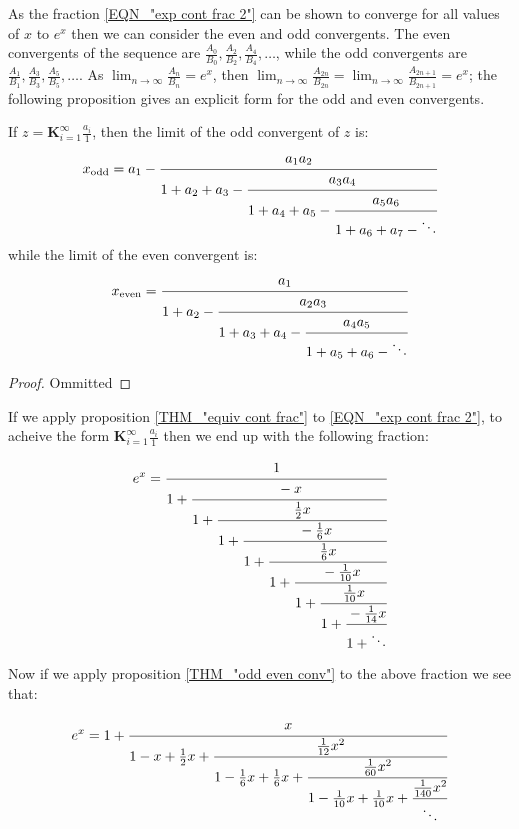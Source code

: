 As the fraction \ref{EQN_"exp cont frac 2"} can be shown to converge for all values of \(x\) to \(e^x\) then we can consider the even and odd convergents. The even convergents of the sequence are \(\frac{A_0}{B_0}, \frac{A_2}{B_2}, \frac{A_4}{B_4}, \ldots\), while the odd convergents are \(\frac{A_1}{B_1}, \frac{A_3}{B_3}, \frac{A_5}{B_5}, \ldots\). As \(\lim_{n\to\infty} \frac{A_n}{B_n}=e^x\), then \(\lim_{n\to\infty}\frac{A_{2n}}{B_{2n}} = \lim_{n\to\infty}\frac{A_{2n+1}}{B_{2n+1}} = e^x\); the following proposition gives an explicit form for the odd and even convergents.

\begin{odd even conv}
\label{THM_"odd even conv"}
If \(z = \mathbf{K}_{i=1}^\infty \frac{a_i}{1}\), then the limit of the odd convergent of \(z\) is:
\begin{displaymath}
	x_{\textrm{odd}}=a_1 - \cfrac{a_1a_2}{1+a_2+a_3 -
						   \cfrac{a_3a_4}{1+a_4+a_5 -
						   \cfrac{a_5a_6}{1+a_6+a_7 - \ddots} } }
\end{displaymath}
while the limit of the even convergent is:
\begin{displaymath}
	x_{\textrm{even}}=\cfrac{a_1}{1+a_2 -
					  \cfrac{a_2a_3}{1+a_3+a_4 -
					  \cfrac{a_4a_5}{1+a_5+a_6 - \ddots} } }
\end{displaymath}
\end{odd even conv}
\begin{proof}
Ommitted
\end{proof}

If we apply proposition \ref{THM_"equiv cont frac"} to \ref{EQN_"exp cont frac 2"}, to acheive the form \(\mathbf{K}_{i=1}^\infty \frac{a_i}{1}\) then we end up with the following fraction:

\begin{equation}
	e^x = \cfrac{1}{1 +
		  \cfrac{-x}{1 +
		  \cfrac{\frac{1}{2}x}{1 +
		  \cfrac{-\frac{1}{6}x}{1 +
		  \cfrac{\frac{1}{6}x}{1 +
		  \cfrac{-\frac{1}{10}x}{1 +
		  \cfrac{\frac{1}{10}x}{1 + 
		  \cfrac{-\frac{1}{14}x}{1 + \ddots} } } } } } } }
\end{equation}

Now if we apply proposition \ref{THM_"odd even conv"} to the above fraction we see that:

\begin{equation}
	e^x = 1 + \cfrac{x}{1 - x + \frac{1}{2}x +
			  \cfrac{\frac{1}{12}x^2}{1 - \frac{1}{6}x + \frac{1}{6}x +
			  \cfrac{\frac{1}{60}x^2}{1 -\frac{1}{10}x +\frac{1}{10}x +
			  \cfrac{\frac{1}{140}x^2}{\ddots} } } }
\end{equation}


